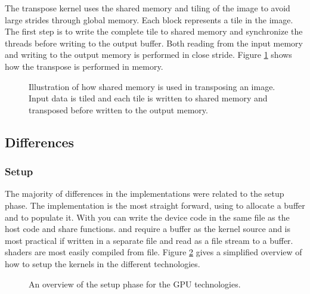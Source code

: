 The transpose kernel uses the shared memory and tiling of the image to avoid large strides through global memory. Each block represents a tile in the image. The first step is to write the complete tile to shared memory and synchronize the threads before writing to the output buffer. Both reading from the input memory and writing to the output memory is performed in close stride. Figure \ref{fig:transpose-memory} shows how the transpose is performed in memory.

\begin{figure}
	\centering
	
	\caption{Illustration of how shared memory is used in transposing an image. Input data is tiled and each tile is written to shared memory and transposed before written to the output memory. }
	\label{fig:transpose-memory}
\end{figure}

\subsection{Differences}%
\subsubsection{Setup}%
The majority of differences in the implementations were related to the setup phase. The {\CU} implementation is the most straight forward, using  to allocate a buffer and  to populate it. With {\CU} you can write the device code in the same file as the host code and share functions. {\OCL} and {\GL} require a  buffer as the kernel source and is most practical if written in a separate file and read as a file stream to a  buffer. {\DX} shaders are most easily compiled from file. Figure \ref{fig:code:setup} gives a simplified overview of how to setup the kernels in the different technologies.%
\begin{figure}%
	\centering%
	\def \setupWidth {\textwidth / 2 - 18pt}%
	\hfill%
	\vfill%
	\hfill%
	\caption{An overview of the setup phase for the GPU technologies.}%
	\label{fig:code:setup}%
\end{figure}%

